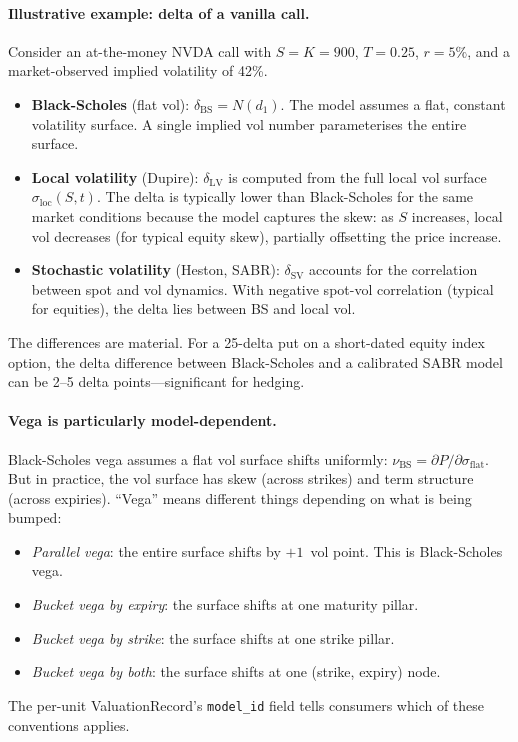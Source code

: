 \documentclass[11pt,a4paper]{article}
\begin{document}
\paragraph{Illustrative example: delta of a vanilla call.}  Consider an at-the-money NVDA call with $S = K = 900$, $T = 0.25$, $r = 5\%$, and a market-observed implied volatility of 42\%.

\begin{itemize}[nosep]
\item \textbf{Black-Scholes} (flat vol): $\delta_{\mathrm{BS}} = N(d_1)$.  The model assumes a flat, constant volatility surface.  A single implied vol number parameterises the entire surface.
\item \textbf{Local volatility} (Dupire): $\delta_{\mathrm{LV}}$ is computed from the full local vol surface $\sigma_{\mathrm{loc}}(S, t)$.  The delta is typically lower than Black-Scholes for the same market conditions because the model captures the skew: as $S$ increases, local vol decreases (for typical equity skew), partially offsetting the price increase.
\item \textbf{Stochastic volatility} (Heston, SABR): $\delta_{\mathrm{SV}}$ accounts for the correlation between spot and vol dynamics.  With negative spot-vol correlation (typical for equities), the delta lies between BS and local vol.
\end{itemize}

\noindent The differences are material.  For a 25-delta put on a short-dated equity index option, the delta difference between Black-Scholes and a calibrated SABR model can be 2--5 delta points---significant for hedging.

\paragraph{Vega is particularly model-dependent.}  Black-Scholes vega assumes a flat vol surface shifts uniformly: $\nu_{\mathrm{BS}} = \partial P / \partial \sigma_{\mathrm{flat}}$.  But in practice, the vol surface has skew (across strikes) and term structure (across expiries).  ``Vega'' means different things depending on what is being bumped:
\begin{itemize}[nosep]
\item \emph{Parallel vega}: the entire surface shifts by $+1$~vol point.  This is Black-Scholes vega.
\item \emph{Bucket vega by expiry}: the surface shifts at one maturity pillar.
\item \emph{Bucket vega by strike}: the surface shifts at one strike pillar.
\item \emph{Bucket vega by both}: the surface shifts at one (strike, expiry) node.
\end{itemize}
The per-unit ValuationRecord's \texttt{model\_id} field tells consumers which of these conventions applies.
\end{document}
